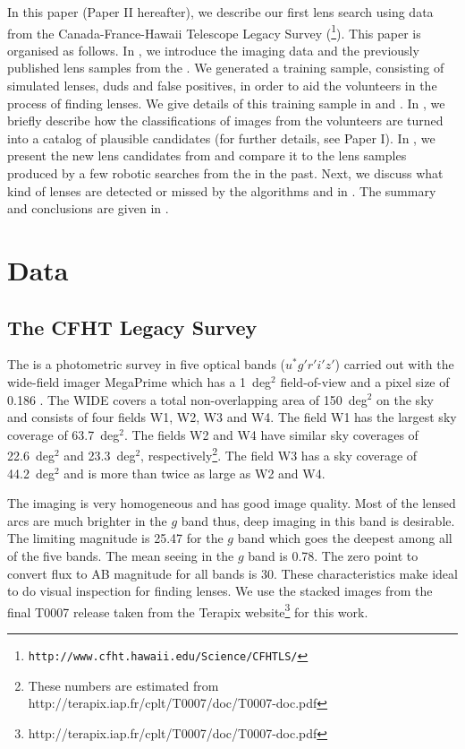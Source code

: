 \documentclass[useAMS,usenatbib,a4paper]{mn2e}
\begin{document}
In this paper (Paper II hereafter), we describe our first lens search
using data from the Canada-France-Hawaii Telescope Legacy Survey
(\cfhtls\footnote{\texttt{http://www.cfht.hawaii.edu/Science/CFHTLS/}}).
This paper is organised as follows. In
, we introduce the \cfhtls imaging data and the
previously published lens samples from the \cfhtls. We generated a training sample,
consisting of simulated lenses, duds and false positives, in order to
aid the \sw volunteers in the process of finding lenses. We give details of this
training sample in  and . In ,
we briefly describe how the classifications of images from the volunteers are
turned into a catalog of plausible candidates (for further details, see
Paper I). In , we present the new lens candidates from \sw and
compare it to the lens samples produced by a few robotic searches from
the \cfhtls in the past. Next, we discuss what kind of lenses are detected
or missed by the algorithms and \sw in . The summary
and conclusions are given in .



\section{Data}
\label{sec:data}
\subsection{The CFHT Legacy Survey}
\label{sec:data:cfhtls}

The \cfhtls is a photometric survey in five optical bands
($u^*g'r'i'z'$) carried out with the wide-field imager MegaPrime which
has a 1~deg$^2$ field-of-view and a pixel size of 0.186\arcsec
\citep{Gwyn2012}. The \cfhtls \textsc{WIDE} covers a total
non-overlapping area of 150~deg$^2$ on the sky and consists of four
fields W1, W2, W3 and W4. The field W1 has the largest sky coverage of
63.7~deg$^2$. The fields W2 and W4 have similar sky coverages of
22.6~deg$^2$ and 23.3~deg$^2$, respectively\footnote{These numbers are
estimated from http://terapix.iap.fr/cplt/T0007/doc/T0007-doc.pdf}.  The
field W3 has a sky coverage of 44.2~deg$^2$ and is more than twice as
large as W2 and W4.

The \cfhtls imaging is very homogeneous and has good image quality. Most
of the lensed arcs are much brighter in the $g$ band thus, deep imaging
in this band is desirable. The limiting magnitude is 25.47 for the $g$
band which goes the deepest among all of the five bands. The mean seeing
in the $g$ band is 0.78\arcsec. The zero point to convert flux to AB
magnitude for all bands is 30. These characteristics make \cfhtls ideal
to do visual inspection for finding lenses.  We use the stacked images
from the final T0007 release taken from the Terapix
website\footnote{{http://terapix.iap.fr/cplt/T0007/doc/T0007-doc.pdf}} for this
work.
\end{document}
